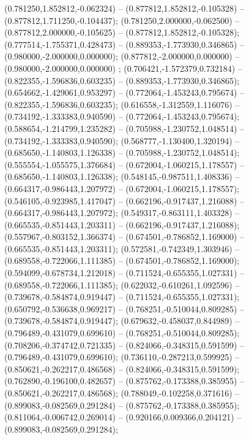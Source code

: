  (0.781250,1.852812,-0.062324) -- (0.877812,1.852812,-0.105328) -- (0.877812,1.711250,-0.104437);
 (0.781250,2.000000,-0.062500) -- (0.877812,2.000000,-0.105625) -- (0.877812,1.852812,-0.105328);
 (0.777514,-1.755371,0.428473) -- (0.889353,-1.773930,0.346865) -- (0.980000,-2.000000,0.000000);
 (0.877812,-2.000000,0.000000) -- (0.980000,-2.000000,0.000000) ;
 (0.706421,-1.572379,0.732184) -- (0.822355,-1.596836,0.603235) -- (0.889353,-1.773930,0.346865);
 (0.654662,-1.429061,0.953297) -- (0.772064,-1.453243,0.795674) -- (0.822355,-1.596836,0.603235);
 (0.616558,-1.312559,1.116076) -- (0.734192,-1.333383,0.940590) -- (0.772064,-1.453243,0.795674);
 (0.588654,-1.214799,1.235282) -- (0.705988,-1.230752,1.048514) -- (0.734192,-1.333383,0.940590);
 (0.568777,-1.130400,1.320194) -- (0.685650,-1.140803,1.126338) -- (0.705988,-1.230752,1.048514);
 (0.555554,-1.055575,1.376684) -- (0.672004,-1.060215,1.178557) -- (0.685650,-1.140803,1.126338);
 (0.548145,-0.987511,1.408336) -- (0.664317,-0.986443,1.207972) -- (0.672004,-1.060215,1.178557);
 (0.546105,-0.923985,1.417047) -- (0.662196,-0.917437,1.216088) -- (0.664317,-0.986443,1.207972);
 (0.549317,-0.863111,1.403328) -- (0.665535,-0.851443,1.203311) -- (0.662196,-0.917437,1.216088);
 (0.557967,-0.803152,1.366374) -- (0.674501,-0.786852,1.169000) -- (0.665535,-0.851443,1.203311);
 (0.572581,-0.742349,1.303946) -- (0.689558,-0.722066,1.111385) -- (0.674501,-0.786852,1.169000);
 (0.594099,-0.678734,1.212018) -- (0.711524,-0.655355,1.027331) -- (0.689558,-0.722066,1.111385);
 (0.622032,-0.610261,1.092596) -- (0.739678,-0.584874,0.919447) -- (0.711524,-0.655355,1.027331);
 (0.650792,-0.536638,0.969217) -- (0.768251,-0.510044,0.809285) -- (0.739678,-0.584874,0.919447);
 (0.679632,-0.458037,0.844989) -- (0.796489,-0.431079,0.699610) -- (0.768251,-0.510044,0.809285);
 (0.708206,-0.374742,0.721335) -- (0.824066,-0.348315,0.591599) -- (0.796489,-0.431079,0.699610);
 (0.736110,-0.287213,0.599925) -- (0.850621,-0.262217,0.486568) -- (0.824066,-0.348315,0.591599);
 (0.762890,-0.196100,0.482657) -- (0.875762,-0.173388,0.385955) -- (0.850621,-0.262217,0.486568);
 (0.788049,-0.102258,0.371616) -- (0.899083,-0.082569,0.291284) -- (0.875762,-0.173388,0.385955);
 (0.811064,-0.006742,0.269014) -- (0.920166,0.009366,0.204121) -- (0.899083,-0.082569,0.291284);
